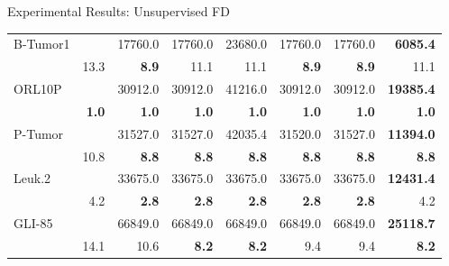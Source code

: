 \documentclass{beamer}
\begin{document}
\begin{frame}{Experimental Results: Unsupervised FD}
\begin{table} [t]
\begin{tabular}{lr|r|r|r|r|r|r|}
	 \multicolumn{1}{|l|}{B-Tumor1}  &  & 17760.0 & 17760.0 & 23680.0 & 17760.0 & 17760.0 & \textbf{6085.4}  \\ \cline{2-8}
   \multicolumn{1}{|l|}{ }    & 13.3 & \textbf{8.9} & 11.1 & 11.1 & \textbf{8.9} & \textbf{8.9} & 11.1 \\ \hline

   \multicolumn{1}{|l|}{ORL10P}  &  & 30912.0 &   30912.0 & 41216.0 &  30912.0 & 30912.0 & \textbf{19385.4} \\ \cline{2-8}
   \multicolumn{1}{|l|}{ }    & \textbf{1.0} & \textbf{1.0} & \textbf{1.0} & \textbf{1.0} & \textbf{1.0} & \textbf{1.0} & \textbf{1.0}\\ \hline

	 \multicolumn{1}{|l|}{P-Tumor}  &  & 31527.0 & 31527.0 & 42035.4 & 31520.0 & 31527.0 & \textbf{11394.0}\\ \cline{2-8}
   \multicolumn{1}{|l|}{ }    & 10.8 & \textbf{8.8} & \textbf{8.8} & \textbf{8.8} & \textbf{8.8} & \textbf{8.8} & \textbf{8.8} \\ \hline

	 \multicolumn{1}{|l|}{Leuk.2}  &  & 33675.0 & 33675.0 & 33675.0 &33675.0 &33675.0 & \textbf{12431.4} \\ \cline{2-8}
   \multicolumn{1}{|l|}{ }  & 4.2 & \textbf{2.8} & \textbf{2.8} & \textbf{2.8} & \textbf{2.8} & \textbf{2.8} & 4.2  \\ \hline

   \multicolumn{1}{|l|}{GLI-85}  &  & 66849.0 & 66849.0 & 66849.0 & 66849.0 & 66849.0 & \textbf{25118.7}\\ \cline{2-8}
   \multicolumn{1}{|l|}{ }    & 14.1 & 10.6 & \textbf{8.2} & \textbf{8.2} & 9.4 & 9.4 & \textbf{8.2} \\ \hline

\end{tabular}
\end{table}
\end{frame}


\end{document}
